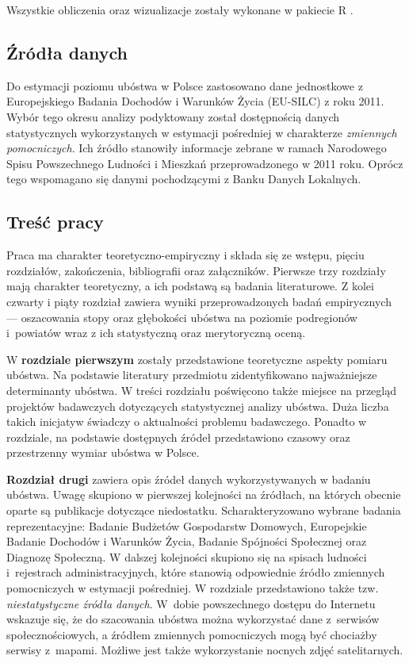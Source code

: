 Wszystkie obliczenia oraz wizualizacje zostały wykonane w pakiecie R \citep{r2016}.

\subsection*{Źródła danych}

Do estymacji poziomu ubóstwa w Polsce zastosowano dane jednostkowe z Europejskiego Badania Dochodów i Warunków Życia (EU-SILC) z roku 2011. Wybór tego okresu analizy podyktowany został dostępnością danych statystycznych wykorzystanych w estymacji pośredniej w charakterze \textit{zmiennych pomocniczych}. Ich źródło stanowiły informacje zebrane w ramach Narodowego Spisu Powszechnego Ludności i Mieszkań przeprowadzonego w 2011 roku. Oprócz tego wspomagano się danymi pochodzącymi z Banku Danych Lokalnych. 

\subsection*{Treść pracy}

Praca ma charakter teoretyczno-empiryczny i składa się ze wstępu, pięciu rozdziałów, zakończenia, bibliografii oraz załączników. Pierwsze trzy rozdziały mają charakter teoretyczny, a ich podstawą są badania literaturowe. Z kolei czwarty i piąty rozdział zawiera wyniki przeprowadzonych badań empirycznych --- oszacowania stopy oraz głębokości ubóstwa na poziomie podregionów i~powiatów wraz z ich statystyczną oraz merytoryczną oceną.

W \textbf{rozdziale pierwszym} zostały przedstawione teoretyczne aspekty pomiaru ubóstwa. Na podstawie literatury przedmiotu zidentyfikowano najważniejsze determinanty ubóstwa. W treści rozdziału poświęcono także miejsce na przegląd projektów badawczych dotyczących statystycznej analizy ubóstwa. Duża liczba takich inicjatyw świadczy o aktualności problemu badawczego. Ponadto w rozdziale, na podstawie dostępnych źródeł przedstawiono czasowy oraz przestrzenny wymiar ubóstwa w Polsce. 

\textbf{Rozdział drugi} zawiera opis źródeł danych wykorzystywanych w badaniu ubóstwa. Uwagę skupiono w pierwszej kolejności na źródłach, na których obecnie oparte są publikacje dotyczące niedostatku. Scharakteryzowano wybrane badania reprezentacyjne: Badanie Budżetów Gospodarstw Domowych, Europejskie Badanie Dochodów i Warunków Życia, Badanie Spójności Społecznej oraz Diagnozę Społeczną. W dalszej kolejności skupiono się na spisach ludności i~rejestrach administracyjnych, które stanowią odpowiednie źródło zmiennych pomocniczych w estymacji pośredniej. W rozdziale przedstawiono także tzw. \textit{niestatystyczne źródła danych}. W~dobie powszechnego dostępu do Internetu wskazuje się, że do szacowania ubóstwa można wykorzystać dane z~serwisów społecznościowych, a źródłem zmiennych pomocniczych mogą być chociażby serwisy z~mapami. Możliwe jest także wykorzystanie nocnych zdjęć satelitarnych. 

